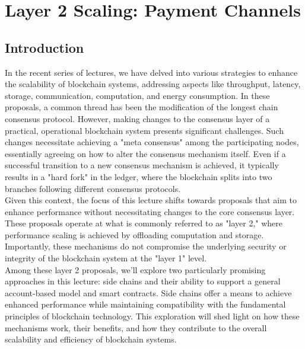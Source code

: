 \chapter{Layer 2 Scaling: Payment Channels}
\section{Introduction}

In the recent series of lectures, we have delved into various strategies to enhance the scalability of blockchain systems, addressing aspects like throughput, latency, storage, communication, computation, and energy consumption. In these proposals, a common thread has been the modification of the longest chain consensus protocol. However, making changes to the consensus layer of a practical, operational blockchain system presents significant challenges. Such changes necessitate achieving a "meta consensus" among the participating nodes, essentially agreeing on how to alter the consensus mechanism itself. Even if a successful transition to a new consensus mechanism is achieved, it typically results in a "hard fork" in the ledger, where the blockchain splits into two branches following different consensus protocols.\\
Given this context, the focus of this lecture shifts towards proposals that aim to enhance performance without necessitating changes to the core consensus layer. These proposals operate at what is commonly referred to as "layer 2," where performance scaling is achieved by offloading computation and storage. Importantly, these mechanisms do not compromise the underlying security or integrity of the blockchain system at the "layer 1" level.\\
Among these layer 2 proposals, we'll explore two particularly promising approaches in this lecture: side chains and their ability to support a general account-based model and smart contracts. Side chains offer a means to achieve enhanced performance while maintaining compatibility with the fundamental principles of blockchain technology. This exploration will shed light on how these mechanisms work, their benefits, and how they contribute to the overall scalability and efficiency of blockchain systems.

